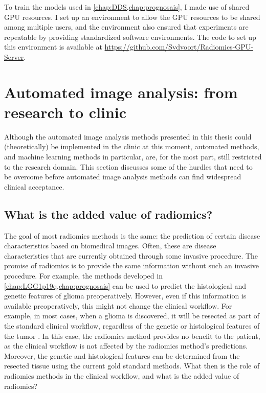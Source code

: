 To train the models used in \cref{chap:DDS,chap:prognosais}, I made use of shared GPU resources.
I set up an environment to allow the GPU resources to be shared among multiple users, and the environment also ensured that experiments are repeatable by providing standardized software environments.
The code to set up this environment is available at \url{https://github.com/Svdvoort/Radiomics-GPU-Server}.




\section{Automated image analysis: from research to clinic}\label{sec:discussion_clinical}

Although the automated image analysis methods presented in this thesis could (theoretically) be implemented in the clinic at this moment, automated methods, and machine learning methods in particular, are, for the most part, still restricted to the research domain.
This section discusses some of the hurdles that need to be overcome before automated image analysis methods can find widespread clinical acceptance.

\subsection{What is the added value of radiomics?}\label{subsec:discussion_added_value_radiomics}

The goal of most radiomics methods is the same: the prediction of certain disease characteristics based on biomedical images.
Often, these are disease characteristics that are currently obtained through some invasive procedure.
The promise of radiomics is to provide the same information without such an invasive procedure.
For example, the methods developed in \cref{chap:LGG1p19q,chap:prognosais} can be used to predict the histological and genetic features of glioma preoperatively.
However, even if this information is available preoperatively, this might not change the clinical workflow.
For example, in most cases, when a glioma is discovered, it will be resected as part of the standard clinical workflow, regardless of the genetic or histological features of the \gls{tumor} \autocite{welle2017gliomaguidelines,stupp2014hggguidelines}.
In this case, the radiomics method provides no benefit to the patient, as the clinical workflow is not affected by the radiomics method's predictions.
Moreover, the genetic and histological features can be determined from the resected tissue using the current gold standard methods.
What then is the role of radiomics methods in the clinical workflow, and what is the added value of radiomics?

